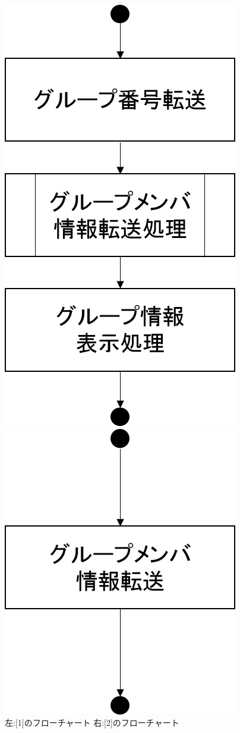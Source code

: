 \begin{figure}[htbp]
 \begin{minipage}{0.5\hsize}
  \begin{center}
   \includegraphics[width=0.5\linewidth,clip]{./img/join_group/sub1.png}
  \end{center}
 \end{minipage}
 \begin{minipage}{0.5\hsize}
  \begin{center}
   \includegraphics[width=0.5\linewidth,clip]{./img/join_group/sub2.png}
  \end{center}
 \end{minipage}
 \caption{左:[1]のフローチャート 右:[2]のフローチャート}\label{fig:joingroupflow0}
\end{figure}

